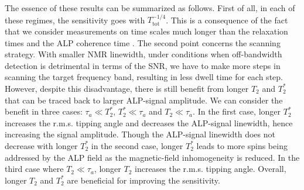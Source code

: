 The essence of these results can be summarized as follows. 
First of all, in each of these regimes, the sensitivity goes with $T_{\mathrm{tot}}^{-1/4}$. 
This is a consequence of the fact that we consider measurements on time scales much longer than the relaxation times and the ALP coherence time \cite{budkergraham2014proposal, Aybas_2021_Quantum_sensitivity}. 
The second point concerns the scanning strategy. 
With smaller NMR linewidth, under conditions when off-bandwidth detection is detrimental in terms of the SNR,  we have to make more steps in scanning the target frequency band, resulting in less dwell time for each step. 
However, despite this disadvantage, 
there is still benefit from longer $T_2$ and $T_2^*$ that can be traced back to larger ALP-signal amplitude. 
We can consider the benefit in three cases: $\tau_a\ll T_2^* $, $T_2^* \ll \tau_a$ and $T_2 \ll \tau_a$. 
In the first case, longer $T_2^*$ increases the r.m.s. tipping angle and decreases the ALP-signal linewidth, hence increasing the signal amplitude. 
Though the ALP-signal linewidth does not decrease with longer $T_2^*$ in the second case, longer $T_2^*$ leads to more spins being addressed by the ALP field as the magnetic-field inhomogeneity is reduced.
In the third case where $T_2 \ll \tau_a$, longer $T_2$ increases the r.m.s. tipping angle. 
Overall, longer $T_2$ and $T_2^*$ are beneficial for improving the sensitivity. 

